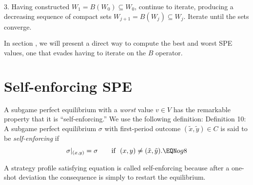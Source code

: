\item{3.}  Having constructed $W_1 = B (W_0) \subseteq W_0$, continue to
iterate, producing a decreasing sequence of compact sets $W_{j+1} = B (W_j)
\subseteq W_j$.  Iterate until the sets converge.


\medskip
In section , we will present a direct way to compute the best and worst
SPE values, one that evades  having to iterate  on
the $B$ operator.
\section{Self-enforcing SPE}
A subgame perfect equilibrium with a {\it worst\/} value
$v\in V$ has  the remarkable property that it is ``self-enforcing.''
We use the following definition:
\medskip\noindent
{\sc Definition 10:}  A subgame perfect equilibrium $\sigma$ with
first-period outcome $(\tilde x,\tilde y)\in C$ is said to be
{\it self-enforcing\/} if
$$\sigma\vert_{(x,y)} = \sigma\qquad \hbox{if }\ (x,y) \not=(\tilde x,\tilde
y) .\EQN og8$$

\noindent
A strategy profile satisfying equation  is called self-enforcing
because after a one-shot deviation the consequence is
simply to restart the equilibrium.
\medskip

